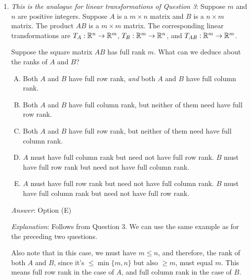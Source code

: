 \documentclass[10pt]{amsart}
\begin{document}
\begin{enumerate}
  {\em Answer}: Option (D)

  {\em Explanation}: This follows from Question 2. We can also think
  of it in terms of the rank of a product being less than or equal to
  the ranks of the individual matrices. This forces the rank of $A$ to
  be at least $m$, and therefore exactly $m$.

  Also, for an example of a situation where $B$ does not have full row
  rank, we can use the same example as in the preceding question.

  {\em Performance review}: 12 out of 27 got this. 6 chose (E), 4
  chose (A), 3 chose (B), 2 chose (C).
\item {\em This is the analogue for linear transformations of Question
  3}: Suppose $m$ and $n$ are positive integers. Suppose $A$ is a $m
  \times n$ matrix and $B$ is a $n \times m$ matrix. The product $AB$
  is a $m \times m$ matrix. The corresponding linear transformations
  are $T_A: \mathbb{R}^n \to \mathbb{R}^m$, $T_B: \mathbb{R}^m \to \mathbb{R}^n$, and $T_{AB}: \mathbb{R}^m
  \to \mathbb{R}^m$. 

  Suppose the square matrix $AB$ has full rank $m$. What can we deduce
  about the ranks of $A$ and $B$?

  \begin{enumerate}[(A)]
  \item Both $A$ and $B$ have full row rank, {\em and} both $A$ and
    $B$ have full column rank.
  \item Both $A$ and $B$ have full column rank, but neither of them
    need have full row rank.
  \item Both $A$ and $B$ have full row rank, but neither of them need
    have full column rank.
  \item $A$ must have full column rank but need not have full row
    rank. $B$ must have full row rank but need not have full column
    rank.
  \item $A$ must have full row rank but need not have full column
    rank. $B$ must have full column rank but need not have full row
    rank.
  \end{enumerate}

  {\em Answer}: Option (E)

  {\em Explanation}: Follows from Question 3. We can use the same
  example as for the preceding two questions.

  Also note that in this case, we must have $m \le n$, and therefore,
  the rank of both $A$ and $B$, since it's $\le \min \{ m, n \}$ but
  also $\ge m$, must equal $m$. This means full row rank in the case
  of $A$, and full column rank in the case of $B$.
  

\end{enumerate}
\end{document}
